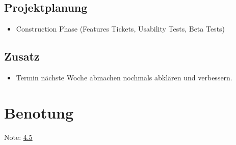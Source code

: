 \documentclass[11pt]{scrartcl}
\begin{document}
\subsection{Projektplanung}
\begin{itemize}
  \item Construction Phase (Features Tickets, Usability Tests, Beta Tests)
\end{itemize}

\subsection{Zusatz}
\begin{itemize}
  \item Termin nächste Woche abmachen nochmals abklären und verbessern.
\end{itemize}

\section{Benotung}
\label{sec:Benotung}
Note: \underline {4.5}
\end{document}
